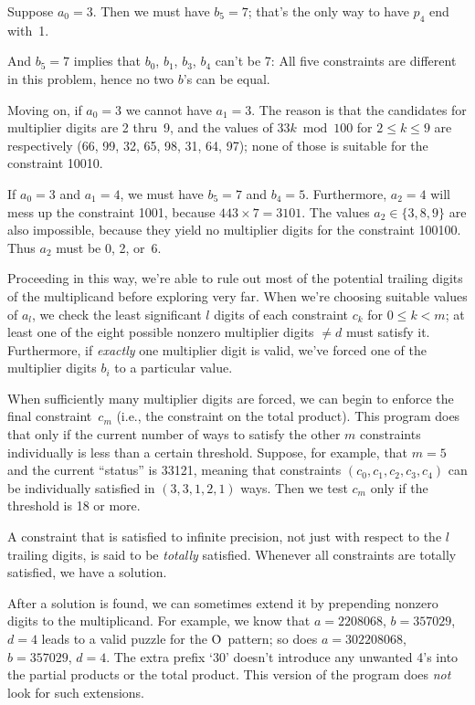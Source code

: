 Suppose $a_0=3$. Then we must have $b_5=7$; that's the only way to
have $p_4$ end with~1.

And $b_5=7$ implies that $b_0$, $b_1$, $b_3$, $b_4$ can't be 7: All five
constraints are different in this problem, hence no two $b$'s can be equal.

Moving on, if $a_0=3$ we cannot have $a_1=3$. The reason is that
the candidates for multiplier digits are 2 thru~9, and the
values of $33k\bmod100$ for $2\le k\le 9$ are respectively
(66, 99, 32, 65, 98, 31, 64, 97); none of those is suitable for
the constraint 10010.

If $a_0=3$ and $a_1=4$, we must have $b_5=7$ and $b_4=5$.
Furthermore, $a_2=4$ will mess up the constraint 1001, because
$443\times7=3101$. The values $a_2\in\{3,8,9\}$
are also impossible, because they yield no multiplier digits for the
constraint 100100. Thus $a_2$ must be 0, 2, or~6.

Proceeding in this way, we're able to rule out most of the potential trailing
digits of the multiplicand before exploring very far. When we're choosing
suitable values of $a_l$, we check the least significant $l$
digits of each constraint $c_k$ for $0\le k<m$; at least one of the eight
possible nonzero multiplier digits $\ne d$ must satisfy it.
Furthermore, if {\it exactly\/} one multiplier digit is valid, we've
forced one of the multiplier digits $b_i$ to a particular value.

When sufficiently many multiplier digits are forced, we can begin to enforce
the final constraint~$c_m$ (i.e., the constraint on the total product).
This program does that only if the current number of ways to satisfy
the other $m$ constraints individually is less than a certain threshold.
Suppose, for example, that $m=5$ and the current ``status'' is 33121,
meaning that constraints $(c_0,c_1,c_2,c_3,c_4)$ can be individually satisfied
in $(3,3,1,2,1)$ ways. Then we test $c_m$ only if the threshold is 18 or more.

A constraint that is satisfied to infinite precision, not just
with respect to the $l$ trailing digits, is said to be {\it totally\/}
satisfied. Whenever all constraints are totally satisfied, we have a
solution.

After a solution is found, we can sometimes extend it by prepending
nonzero digits to the multiplicand.
For example, we know that $a=2208068$, $b=357029$,
$d=4$ leads to a valid puzzle for the \.O~pattern; so does
$a=302208068$, $b=357029$, $d=4$. The extra prefix `30' doesn't
introduce any unwanted 4's into the partial products or the total product.
This version of the program does {\it not\/} look for such extensions.

